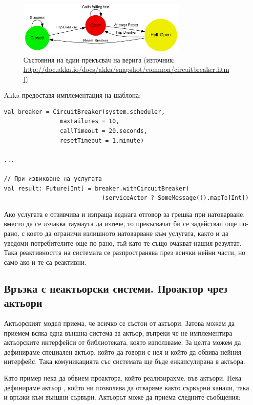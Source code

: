 \begin{figure}
  \centering\includegraphics[width=0.75\textwidth]{images/circuit-breaker-states.png}
  \caption[Състояния на един прекъсвач на верига]{Състояния на един прекъсвач на верига (източник: \url{http://doc.akka.io/docs/akka/snapshot/common/circuitbreaker.html})}
  \label{fig:circuit-breaker-states}
\end{figure}

Akka предоставя имплементация на шаблона:

\begin{lstlisting}[texcl=true]
val breaker = CircuitBreaker(system.scheduler, 
                maxFailures = 10, 
                callTimeout = 20.seconds, 
                resetTimeout = 1.minute)

...

// При извикване на услугата
val result: Future[Int] = breaker.withCircuitBreaker(
                            (serviceActor ? SomeMessage()).mapTo[Int])
\end{lstlisting}

Ако услугата е отзивчива и изпраща веднага отговор за грешка при натоварване, вместо да се изчаква таумаута да изтече, то прекъсвачат би се задействал още по-рано, с което да ограничи излишното натоварване към услугата, както и да уведоми потребителите още по-рано, тъй като те също очакват нашия резултат. Така реактивността на системата се разпространява през всички нейни части, но само ако и те са реактивни.

\subsection{Връзка с неактьорски системи. Проактор чрез актьори}

Актьорският модел приема, че всичко се състои от актьори. Затова можем да приемем всяка една външна система за актьор, въпреки че не имплементира актьорските интерфейси от библиотеката, която използваме. За целта можем да дефинираме специален актьор, който да говори с нея и който да обвива нейния интерфейс. Така комуникацията със системата ще бъде енкапсулирана в актьора.

Като пример нека да обвием проактора, който реализирахме, във актьори. Нека дефинираме актьор , който ни позволява да отваряме както сървърни канали, така и връзки към външни сървъри. Актьорът може да приема следните съобщения:

